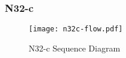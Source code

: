 \begin{minipage}{0.5\textwidth}
\end{minipage}
\begin{minipage}{0.4\textwidth}
\end{minipage}

\subsubsection{N32-c}

\begin{figure}[h!]
    \centering
    \texttt{[image: n32c-flow.pdf]}
    \caption{N32-c Sequence Diagram}
    \label{fig:n32c-sequence}
\end{figure}

